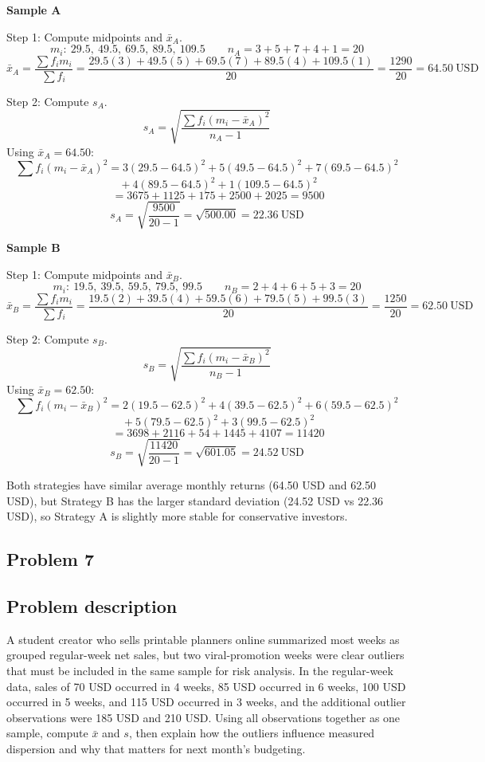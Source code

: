\begin{ExamProblems}
		\textbf{Sample A}

		Step 1: Compute midpoints and $\bar{x}_A$.
		\[
		m_i:\ 29.5,\ 49.5,\ 69.5,\ 89.5,\ 109.5
		\qquad
		n_A = 3+5+7+4+1 = 20
		\]
		\[
		\bar{x}_A = \frac{\sum f_i m_i}{\sum f_i}
		= \frac{29.5(3)+49.5(5)+69.5(7)+89.5(4)+109.5(1)}{20}
		= \frac{1290}{20}
		= 64.50\ \text{USD}
		\]

		Step 2: Compute $s_A$.
		\[
		s_A = \sqrt{\frac{\sum f_i(m_i-\bar{x}_A)^2}{n_A-1}}
		\]
		Using $\bar{x}_A=64.50$:
		\[
		\sum f_i(m_i-\bar{x}_A)^2 = 3(29.5-64.5)^2 + 5(49.5-64.5)^2 + 7(69.5-64.5)^2
		\]
		\[
		\qquad + 4(89.5-64.5)^2 + 1(109.5-64.5)^2
		\]
		\[
		\qquad = 3675 + 1125 + 175 + 2500 + 2025 = 9500
		\]
		\[
		s_A = \sqrt{\frac{9500}{20-1}} = \sqrt{500.00} = 22.36\ \text{USD}
		\]

		\textbf{Sample B}

		Step 1: Compute midpoints and $\bar{x}_B$.
		\[
		m_i:\ 19.5,\ 39.5,\ 59.5,\ 79.5,\ 99.5
		\qquad
		n_B = 2+4+6+5+3 = 20
		\]
		\[
		\bar{x}_B = \frac{\sum f_i m_i}{\sum f_i}
		= \frac{19.5(2)+39.5(4)+59.5(6)+79.5(5)+99.5(3)}{20}
		= \frac{1250}{20}
		= 62.50\ \text{USD}
		\]

		Step 2: Compute $s_B$.
		\[
		s_B = \sqrt{\frac{\sum f_i(m_i-\bar{x}_B)^2}{n_B-1}}
		\]
		Using $\bar{x}_B=62.50$:
		\[
		\sum f_i(m_i-\bar{x}_B)^2 = 2(19.5-62.5)^2 + 4(39.5-62.5)^2 + 6(59.5-62.5)^2
		\]
		\[
		\qquad + 5(79.5-62.5)^2 + 3(99.5-62.5)^2
		\]
		\[
		\qquad = 3698 + 2116 + 54 + 1445 + 4107 = 11420
		\]
		\[
		s_B = \sqrt{\frac{11420}{20-1}} = \sqrt{601.05} = 24.52\ \text{USD}
		\]

		Both strategies have similar average monthly returns (64.50 USD and 62.50 USD), but Strategy B has the larger standard deviation (24.52 USD vs 22.36 USD), so Strategy A is slightly more stable for conservative investors.

		\newpage
		\item
		\subsection*{Problem 7}
		\subsection*{Problem description}
		A student creator who sells printable planners online summarized most weeks as grouped regular-week net sales, but two viral-promotion weeks were clear outliers that must be included in the same sample for risk analysis. In the regular-week data, sales of 70 USD occurred in 4 weeks, 85 USD occurred in 6 weeks, 100 USD occurred in 5 weeks, and 115 USD occurred in 3 weeks, and the additional outlier observations were 185 USD and 210 USD. Using all observations together as one sample, compute $\bar{x}$ and $s$, then explain how the outliers influence measured dispersion and why that matters for next month's budgeting.


\end{ExamProblems}

